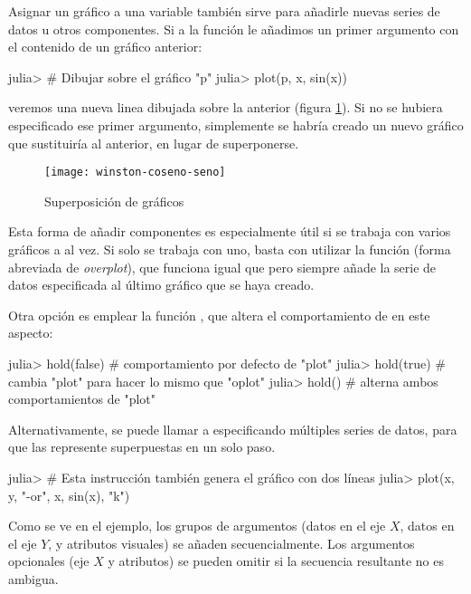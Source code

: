 Asignar un gráfico a una variable también sirve para añadirle nuevas series de datos u otros componentes. Si a la función  le añadimos un primer argumento con el contenido de un gráfico anterior:

\begin{jlconcode}
julia> # Dibujar sobre el gráfico "p"
julia> plot(p, x, sin(x))
\end{jlconcode}

veremos una nueva linea dibujada sobre la anterior (figura \ref{fig:winston-superposicion}). Si no se hubiera especificado ese primer argumento, simplemente se habría creado un nuevo gráfico que sustituiría al anterior, en lugar de superponerse.

\begin{figure}
\centering
\texttt{[image: winston-coseno-seno]}
\caption{Superposición de gráficos}
\label{fig:winston-superposicion}
\end{figure}

Esta forma de añadir componentes es especialmente útil si se trabaja con varios gráficos a al vez. Si solo se trabaja con uno, basta con utilizar la función  (forma abreviada de \emph{overplot}), que funciona igual que  pero siempre añade la serie de datos especificada al último gráfico que se haya creado.

Otra opción es emplear la función , que altera el comportamiento de  en este aspecto:

\begin{jlconcode}
julia> hold(false) # comportamiento por defecto de "plot"
julia> hold(true)  # cambia "plot" para hacer lo mismo que "oplot"
julia> hold()      # alterna ambos comportamientos de "plot"
\end{jlconcode}

Alternativamente, se puede llamar a  especificando múltiples series de datos, para que las represente superpuestas en un solo paso.

\begin{jlconcode}
julia> # Esta instrucción también genera el gráfico con dos líneas
julia> plot(x, y, "-or", x, sin(x), "k")
\end{jlconcode}

Como se ve en el ejemplo, los grupos de argumentos (datos en el eje $X$, datos en el eje $Y$, y atributos visuales) se añaden secuencialmente. Los argumentos opcionales (eje $X$ y atributos) se pueden omitir si la secuencia resultante no es ambigua.

